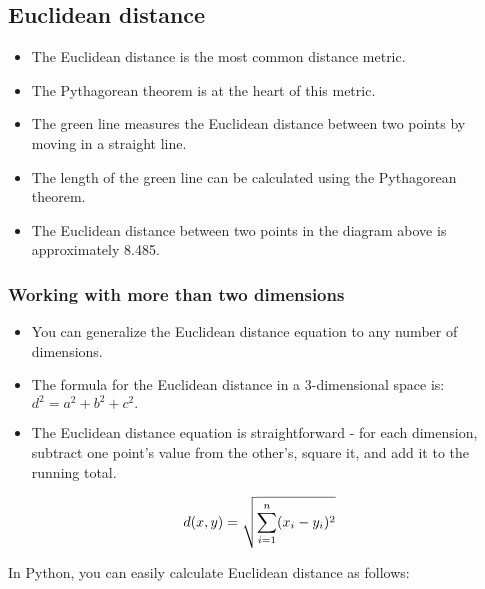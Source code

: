 \documentclass[11pt]{article}
\providecommand{\tightlist}{%
      \setlength{\itemsep}{0pt}\setlength{\parskip}{0pt}}
\begin{document}
\hypertarget{euclidean-distance}{%
\subsection{Euclidean distance}\label{euclidean-distance}}

\begin{itemize}
\tightlist
\item
  The Euclidean distance is the most common distance metric.
\item
  The Pythagorean theorem is at the heart of this metric.
\item
  The green line measures the Euclidean distance between two points by
  moving in a straight line.
\item
  The length of the green line can be calculated using the Pythagorean
  theorem.
\item
  The Euclidean distance between two points in the diagram above is
  approximately 8.485.
\end{itemize}

\hypertarget{working-with-more-than-two-dimensions}{%
\subsubsection{Working with more than two
dimensions}\label{working-with-more-than-two-dimensions}}

\begin{itemize}
\tightlist
\item
  You can generalize the Euclidean distance equation to any number of
  dimensions.
\item
  The formula for the Euclidean distance in a 3-dimensional space is:
  \(d^2 = a^2 + b^2 + c^2.\)
\item
  The Euclidean distance equation is straightforward - for each
  dimension, subtract one point's value from the other's, square it, and
  add it to the running total.
\end{itemize}

\[ \large d(x,y) = \sqrt{\sum_{i=1}^{n}(x_i - y_i)^2} \]

In Python, you can easily calculate Euclidean distance as follows:
\end{document}
